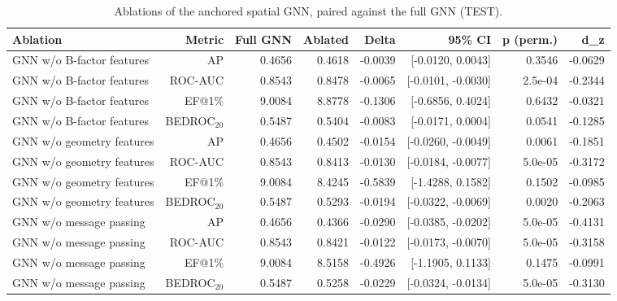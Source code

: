 \begin{table}[t]
\centering
\small
\caption{Ablations of the anchored spatial GNN, paired against the full GNN (TEST).}
\label{tab:table3b_gnn_ablations_test}
\begin{tabular}{lrrrrrrr}
\toprule
Ablation & Metric & Full GNN & Ablated & Delta & 95\% CI & p (perm.) & d\_z \\
\midrule
GNN w/o B-factor features & AP & 0.4656 & 0.4618 & -0.0039 & [-0.0120, 0.0043] & 0.3546 & -0.0629 \\
GNN w/o B-factor features & ROC-AUC & 0.8543 & 0.8478 & -0.0065 & [-0.0101, -0.0030] & 2.5e-04 & -0.2344 \\
GNN w/o B-factor features & EF@1\% & 9.0084 & 8.8778 & -0.1306 & [-0.6856, 0.4024] & 0.6432 & -0.0321 \\
GNN w/o B-factor features & BEDROC$_{20}$ & 0.5487 & 0.5404 & -0.0083 & [-0.0171, 0.0004] & 0.0541 & -0.1285 \\
GNN w/o geometry features & AP & 0.4656 & 0.4502 & -0.0154 & [-0.0260, -0.0049] & 0.0061 & -0.1851 \\
GNN w/o geometry features & ROC-AUC & 0.8543 & 0.8413 & -0.0130 & [-0.0184, -0.0077] & 5.0e-05 & -0.3172 \\
GNN w/o geometry features & EF@1\% & 9.0084 & 8.4245 & -0.5839 & [-1.4288, 0.1582] & 0.1502 & -0.0985 \\
GNN w/o geometry features & BEDROC$_{20}$ & 0.5487 & 0.5293 & -0.0194 & [-0.0322, -0.0069] & 0.0020 & -0.2063 \\
GNN w/o message passing & AP & 0.4656 & 0.4366 & -0.0290 & [-0.0385, -0.0202] & 5.0e-05 & -0.4131 \\
GNN w/o message passing & ROC-AUC & 0.8543 & 0.8421 & -0.0122 & [-0.0173, -0.0070] & 5.0e-05 & -0.3158 \\
GNN w/o message passing & EF@1\% & 9.0084 & 8.5158 & -0.4926 & [-1.1905, 0.1133] & 0.1475 & -0.0991 \\
GNN w/o message passing & BEDROC$_{20}$ & 0.5487 & 0.5258 & -0.0229 & [-0.0324, -0.0134] & 5.0e-05 & -0.3130 \\
\bottomrule
\end{tabular}
\end{table}
